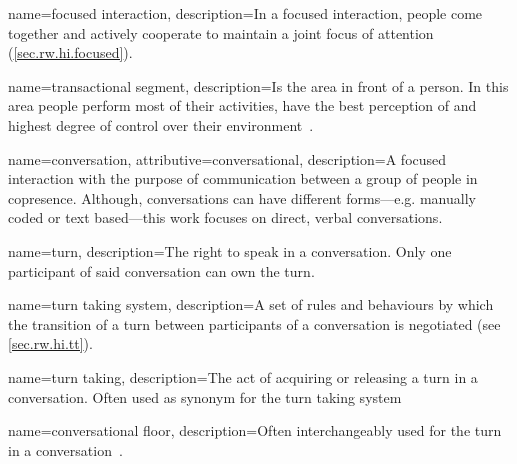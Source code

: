{
	name={focused interaction},
	description={In a \gls{focused interaction}, people come together and actively cooperate to maintain a joint focus of attention (\cref{sec.rw.hi.focused}).}
}

{
	name={transactional segment},
	description={Is the area in front of a person. In this area people perform most of their activities, have the best perception of and highest degree of control over their environment~\cite[p. 240]{Ciolek1980}.}
}

{
	name={conversation},
	attributive={conversational},
	description={A \gls{focused interaction} with the purpose of communication between a group of people in \gls{copresence}. Although, \glspl{conversation} can have different forms---e.g. manually coded or text based---this work focuses on direct, verbal \glspl{conversation}.}
}

{
	name={turn},
	description={The right to speak in a \gls{conversation}. Only one participant of said \gls{conversation} can own the \gls{turn}.}
}

{
	name={turn taking system},
	description={A set of rules and behaviours by which the transition of a \gls{turn} between participants of a \gls{conversation} is negotiated (see \cref{sec.rw.hi.tt}).}
}

{
	name={turn taking},
	description={The act of acquiring  or releasing a \gls{turn} in a \gls{conversation}. Often used as synonym for the \gls{turn taking system}}
}

{
	name={conversational floor},
	description={Often interchangeably used for the \gls{turn} in a \gls{conversation}~\cite[]{Hayashi1988a}.}
}

